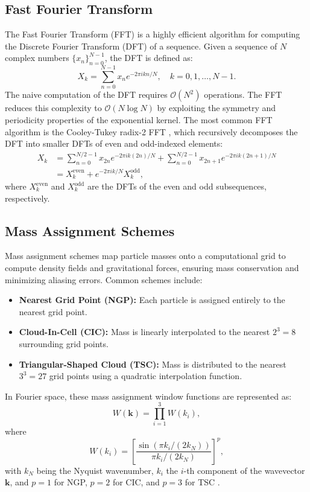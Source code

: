 \subsection{Fast Fourier Transform}
The Fast Fourier Transform (FFT) is a highly efficient algorithm for computing the Discrete Fourier Transform (DFT) of a sequence. Given a sequence of $N$ complex numbers $\{x_n\}_{n=0}^{N-1}$, the DFT is defined as:
\begin{equation}
    X_k = \sum_{n=0}^{N-1} x_n e^{-2\pi i kn / N}, \quad k = 0, 1, \dots, N-1.
\end{equation}
The naive computation of the DFT requires $\mathcal{O}(N^2)$ operations. The FFT reduces this complexity to $\mathcal{O}(N \log N)$ by exploiting the symmetry and periodicity properties of the exponential kernel. The most common FFT algorithm is the Cooley-Tukey radix-2 FFT \citep{d3ea2d52-5ab2-3128-8b80-efb85267295d}, which recursively decomposes the DFT into smaller DFTs of even and odd-indexed elements:
\begin{align}
    X_k &= \sum_{n=0}^{N/2-1} x_{2n} e^{-2\pi i k (2n) / N} + \sum_{n=0}^{N/2-1} x_{2n+1} e^{-2\pi i k (2n+1) / N} \\
         &= X_k^{\text{even}} + e^{-2\pi i k / N} X_k^{\text{odd}},
\end{align}
where $X_k^{\text{even}}$ and $X_k^{\text{odd}}$ are the DFTs of the even and odd subsequences, respectively.

\subsection{Mass Assignment Schemes}\label{sec:mass-assignment}
Mass assignment schemes map particle masses onto a computational grid to compute density fields and gravitational forces, ensuring mass conservation and minimizing aliasing errors. Common schemes include:
\begin{itemize}
    \item \textbf{Nearest Grid Point (NGP):} Each particle is assigned entirely to the nearest grid point.
    \item \textbf{Cloud-In-Cell (CIC):} Mass is linearly interpolated to the nearest $2^3 = 8$ surrounding grid points.
    \item \textbf{Triangular-Shaped Cloud (TSC):} Mass is distributed to the nearest $3^3 = 27$ grid points using a quadratic interpolation function.
\end{itemize}
In Fourier space, these mass assignment window functions are represented as:
\begin{equation}
    W(\mathbf{k}) = \prod_{i=1}^{3} W(k_i),
\end{equation}
where
\begin{equation}
    W(k_i) = \left[\frac{\sin\left(\pi k_i / (2 k_N)\right)}{\pi k_i / (2 k_N)}\right]^p,
\end{equation}
with $k_N$ being the Nyquist wavenumber, $k_i$ the $i$-th component of the wavevector $\mathbf{k}$, and $p = 1$ for NGP, $p = 2$ for CIC, and $p = 3$ for TSC \citep{1981csup.book.....H, 1985ApJS...57..241E}.

